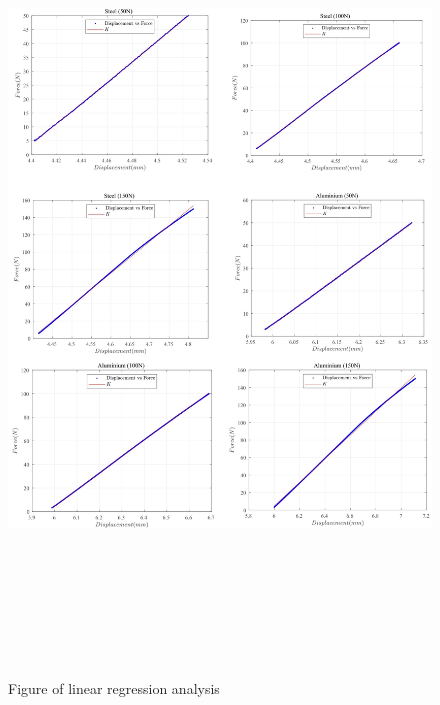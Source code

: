\begin{figure}
    \centering
    \includegraphics[width=15cm,height=21.5cm]{./fig/mix.jpg}
    \caption{Figure of linear regression analysis}
    \label{f1}
\end{figure}

